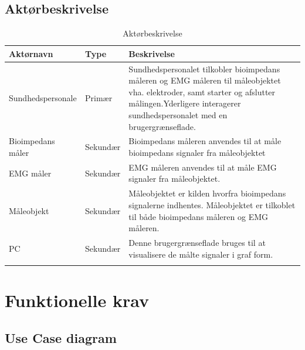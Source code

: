 \documentclass[main.tex]{subfiles}
\begin{document}
\subsection{Aktørbeskrivelse}
\begin{table}[H]
\begin{tabularx}{\textwidth}{l l X}
     Aktørnavn	&	Type		&	Beskrivelse \\ \midrule
     Sundhedspersonale   	& 	Primær  	& 	Sundhedspersonalet tilkobler bioimpedans måleren og EMG måleren til måleobjektet vha. elektroder, samt starter og afslutter målingen.Yderligere interagerer sundhedspersonalet med en brugergrænseflade.     \\ 			  \addlinespace[2mm]
     Bioimpedans måler	&	Sekundær	& Bioimpedans måleren anvendes til at måle bioimpedans signaler fra måleobjektet  	 \\   \addlinespace[2mm]

  EMG måler	&	Sekundær	&	EMG måleren anvendes til at måle EMG signaler fra måleobjektet.
     \\   \addlinespace[2mm]
    
    Måleobjekt	&	Sekundær	&	Måleobjektet er kilden  hvorfra bioimpedans signalerne indhentes. Måleobjektet er tilkoblet til både bioimpedans måleren og EMG måleren.
     \\   \addlinespace[2mm]
     
      
    PC	&	Sekundær	&	Denne brugergrænseflade bruges til at visualisere de målte signaler i graf form.
     \\   \addlinespace[2mm]
     
   
     \bottomrule                                                                                                                   
    \end{tabularx}
    \caption {Aktørbeskrivelse}
    \label{tab:aktoerbeskrivelse}
	
\end{table}


\section{Funktionelle krav}
\subsection{Use Case diagram}
\end{document}
